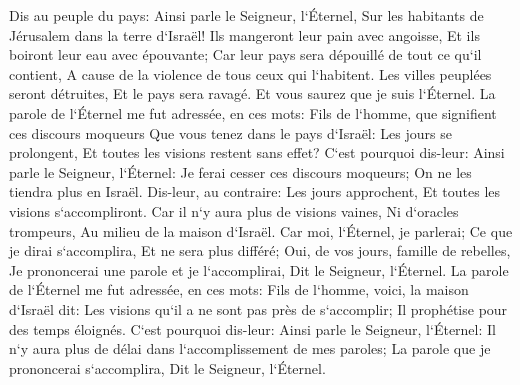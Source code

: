 \verse Dis au peuple du pays: Ainsi parle le Seigneur, l`Éternel, Sur les habitants de Jérusalem dans la terre d`Israël! Ils mangeront leur pain avec angoisse, Et ils boiront leur eau avec épouvante; Car leur pays sera dépouillé de tout ce qu`il contient, A cause de la violence de tous ceux qui l`habitent. 
\verse Les villes peuplées seront détruites, Et le pays sera ravagé. Et vous saurez que je suis l`Éternel. 
\verse La parole de l`Éternel me fut adressée, en ces mots: 
\verse Fils de l`homme, que signifient ces discours moqueurs Que vous tenez dans le pays d`Israël: Les jours se prolongent, Et toutes les visions restent sans effet? 
\verse C`est pourquoi dis-leur: Ainsi parle le Seigneur, l`Éternel: Je ferai cesser ces discours moqueurs; On ne les tiendra plus en Israël. Dis-leur, au contraire: Les jours approchent, Et toutes les visions s`accompliront. 
\verse Car il n`y aura plus de visions vaines, Ni d`oracles trompeurs, Au milieu de la maison d`Israël. 
\verse Car moi, l`Éternel, je parlerai; Ce que je dirai s`accomplira, Et ne sera plus différé; Oui, de vos jours, famille de rebelles, Je prononcerai une parole et je l`accomplirai, Dit le Seigneur, l`Éternel. 
\verse La parole de l`Éternel me fut adressée, en ces mots: 
\verse Fils de l`homme, voici, la maison d`Israël dit: Les visions qu`il a ne sont pas près de s`accomplir; Il prophétise pour des temps éloignés. 
\verse C`est pourquoi dis-leur: Ainsi parle le Seigneur, l`Éternel: Il n`y aura plus de délai dans l`accomplissement de mes paroles; La parole que je prononcerai s`accomplira, Dit le Seigneur, l`Éternel. 

\chapter{}

